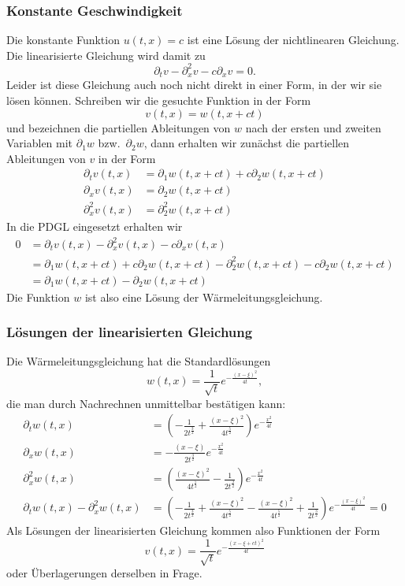 \subsubsection{Konstante Geschwindigkeit}
Die konstante Funktion $u(t,x)=c$ ist eine Lösung der nichtlinearen
Gleichung. Die linearisierte Gleichung wird damit zu
\[
\partial_tv
-\partial_x^2v
-c\partial_xv=0.
\]
Leider ist diese Gleichung auch noch nicht direkt in einer Form,
in der wir sie lösen können. Schreiben wir die gesuchte Funktion
in der Form
\[
v(t,x)=w(t,x+ct)
\]
und bezeichnen die partiellen Ableitungen von $w$ nach der ersten
und zweiten Variablen mit $\partial_1w$ bzw.~$\partial_2w$, dann
erhalten wir zunächst die partiellen Ableitungen von $v$
in der Form
\begin{align*}
\partial_t v(t,x)&=\partial_1w(t,x+ct)+c\partial_2w(t,x+ct)
\\
\partial_x v(t,x)&=\partial_2w(t,x+ct)
\\
\partial_x^2v(t,x)&=\partial_2^2w(t,x+ct)
\end{align*}
In die PDGL eingesetzt erhalten wir
\begin{align*}
0&=
\partial_t v(t,x)
-\partial_x^2v(t,x)
-c\partial_x v(t,x)
\\
&=
\partial_1w(t,x+ct)+c\partial_2w(t,x+ct)
-\partial_2^2w(t,x+ct)
-c\partial_2w(t,x+ct)
\\
&=\partial_1w(t,x+ct)-\partial_2w(t,x+ct)
\end{align*}
Die Funktion $w$ ist also eine Lösung der Wärmeleitungsgleichung.

\subsubsection{Lösungen der linearisierten Gleichung}
Die Wärmeleitungsgleichung hat die Standardlösungen
\[
w(t,x)=\frac1{\sqrt{t}}e^{-\frac{(x-\xi)^2}{4t}},
\]
die man durch Nachrechnen unmittelbar bestätigen kann:
\begin{align*}
\partial_t w(t,x)
&=
\left(
-\frac1{2t^{\frac32}}
+\frac{(x-\xi)^2}{4t^{\frac52}}
\right)e^{-\frac{x^2}{4t}}
\\
\partial_x w(t,x)
&=
-\frac{(x-\xi)}{2t^{\frac32}}
e^{-\frac{x^2}{4t}}
\\
\partial_x^2w(t,x)
&=
\left(
\frac{(x-\xi)^2}{4t^{\frac52}}
-\frac{1}{2t^{\frac32}}
\right)e^{-\frac{x^2}{4t}}
\\
\partial_tw(t,x)-\partial_x^2w(t,x)
&=
\left(
-\frac1{2t^{\frac32}}
+\frac{(x-\xi)^2}{4t^{\frac52}}
-\frac{(x-\xi)^2}{4t^{\frac52}}
+\frac{1}{2t^{\frac32}}
\right)e^{-\frac{(x-\xi)^2}{4t}}=0
\end{align*}
Als Lösungen der linearisierten Gleichung kommen also Funktionen der
Form
\[
v(t,x)=\frac1{\sqrt{t}}e^{-\frac{(x-\xi+ct)^2}{4t}}
\]
oder Überlagerungen derselben in Frage.

